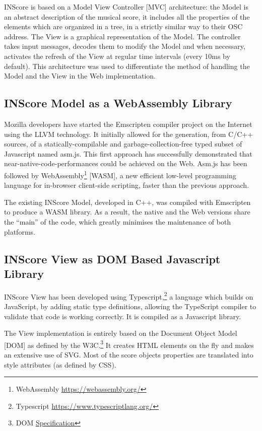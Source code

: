 \documentclass{article}
\begin{document}
INScore is based on a Model View Controller [MVC] architecture: the Model is an abstract description of the musical score, it includes all the properties of the elements which are organized in a tree, in a strictly similar way to their OSC address. The View is a graphical representation of the Model.
The controller takes input messages, decodes them to modify the Model and when necessary, activates the refresh of the View at regular time intervals (every 10ms by default).
This architecture was used to differentiate the method of handling the Model and the View in the Web implementation.

\subsection{INScore Model as a WebAssembly Library}

Mozilla developers have started the Emscripten compiler project \cite{10.1145/2048147.2048224} on the Internet using the LLVM technology. It initially allowed for the generation, from C/C++ sources, of a statically-compilable and garbage-collection-free typed subset of Javascript named asm.js. This first approach has successfully demonstrated that near-native-code-performances could be achieved on the Web. Asm.js has been followed by WebAssembly\footnote{WebAssembly \url{https://webassembly.org/}} [WASM], a new efficient low-level programming language for in-browser client-side scripting, faster than the previous approach.

The existing INScore Model, developed in C++, was compiled with Emscripten to produce a WASM library. 
As a result, the native and the Web versions share the ``main'' of the code, which greatly minimises the maintenance of both platforms.

\subsection{INScore View as DOM Based Javascript Library}

INScore View has been developed using Typescript,\footnote{Typescript \url{https://www.typescriptlang.org/}} a language which builds on JavaScript, by adding static type definitions, allowing the TypeScript compiler to validate that code is working correctly. It is compiled as a Javascript library.

The View implementation is entirely based on the Document Object Model [DOM] as defined by the W3C.\footnote{DOM \href{https://www.w3.org/TR/2000/WD-DOM-Level-1-20000929/DOM.pdf}{Specification}} It creates HTML elements on the fly and makes an extensive use of SVG. Most of the score objects properties are translated into style attributes (as defined by CSS).
\end{document}
